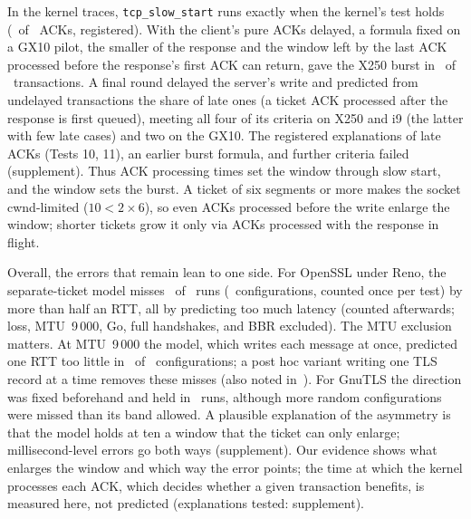 \documentclass[sigconf,9pt,nonacm]{acmart}
\newcommand{\citeone}{\cite{paperone}}
\begin{document}
In the kernel traces, \texttt{tcp\_slow\_start} runs exactly when the kernel's test holds (\StPOneRight\ of \StPOneN\ ACKs, registered). With the client's pure ACKs delayed, a formula fixed on a GX10 pilot, the smaller of the response and the window left by the last ACK processed before the response's first ACK can return, gave the X250 burst in \RbTestTxOk\ of \RbTestTxN\ transactions. A final round delayed the server's write and predicted from undelayed transactions the share of late ones (a ticket ACK processed after the response is first queued), meeting all four of its criteria on X250 and i9 (the latter with few late cases) and two on the GX10. The registered explanations of late ACKs (Tests 10, 11), an earlier burst formula, and further criteria failed (supplement). Thus ACK processing times set the window through slow start, and the window sets the burst. A ticket of six segments or more makes the socket cwnd-limited ($10<2\times6$), so even ACKs processed before the write enlarge the window; shorter tickets grow it only via ACKs processed with the response in flight.

Overall, the errors that remain lean to one side. For OpenSSL under Reno, the separate-ticket model misses \OsSlow\ of \OsRuns\ runs (\OsCells\ configurations, counted once per test) by more than half an RTT, all by predicting too much latency (counted afterwards; loss, MTU~9\,000, Go, full handshakes, and BBR excluded). The MTU exclusion matters. At MTU~9\,000 the model, which writes each message at once, predicted one RTT too little in \NineDefWrong\ of \NineDefN\ configurations; a post hoc variant writing one TLS record at a time removes these misses (also noted in~\citeone). For GnuTLS the direction was fixed beforehand and held in \GtlsFastCellRuns\ runs, although more random configurations were missed than its band allowed. A plausible explanation of the asymmetry is that the model holds at ten a window that the ticket can only enlarge; millisecond-level errors go both ways (supplement). Our evidence shows what enlarges the window and which way the error points; the time at which the kernel processes each ACK, which decides whether a given transaction benefits, is measured here, not predicted (explanations tested: supplement).
\end{document}
